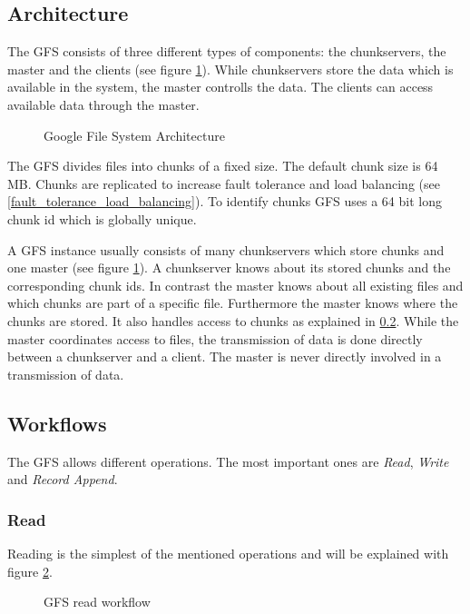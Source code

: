 \documentclass{sig-alternate}
\begin{document}
\subsection{Architecture}
The GFS consists of three different types of components: the chunkservers, the master and the clients (see figure \ref{fig:gfs_architecture}). While chunkservers store the data which is available in the system, the master controlls the data. The clients can access available data through the master.

\begin{figure}[!hbt]
\centering
{}
\caption{Google File System Architecture}
\label{fig:gfs_architecture}
\end{figure}

The GFS divides files into chunks of a fixed size. The default chunk size is 64 MB.
Chunks are replicated to increase fault tolerance and load balancing (see \ref{fault_tolerance_load_balancing}). To identify chunks GFS uses a 64 bit long chunk id which is globally unique.~\cite{google1}

A GFS instance usually consists of many chunkservers which store chunks and one master (see figure \ref{fig:gfs_architecture}). A chunkserver knows about its stored chunks and the corresponding chunk ids. In contrast the master knows about all existing files and which chunks are part of a specific file. Furthermore the master knows where the chunks are stored. It also handles access to chunks as explained in \ref{gfs_workflows}. While the master coordinates access to files, the transmission of data is done directly between a chunkserver and a client. The master is never directly involved in a transmission of data.

\subsection{Workflows}
\label{gfs_workflows}
The GFS allows different operations. The most important ones are \textit{Read}, \textit{Write} and \textit{Record Append}.

\subsubsection{Read}
Reading is the simplest of the mentioned operations and will be explained with figure \ref{fig:gfs_read}.

\begin{figure}[!hbt]
\centering
{}
\caption{GFS read workflow}
\label{fig:gfs_read}
\end{figure}
\end{document}
